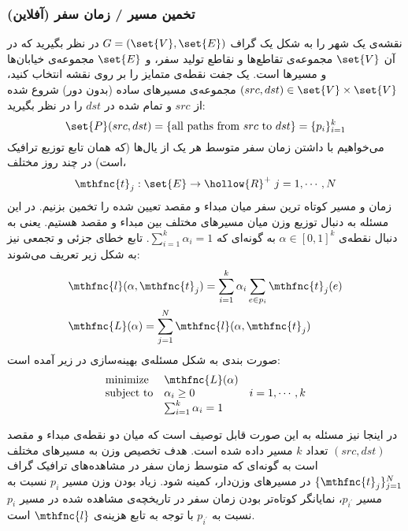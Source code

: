 \subsubsection{
تخمین مسیر / زمان سفر (آفلاین)
}
نقشه‌ی یک شهر را به شکل یک گراف
$G = (\set{V},\set{E})$
در نظر بگیرید که در آن
$\set{V}$
مجموعه‌ی تقاطع‌ها و نقاطع تولید سفر، و
$\set{E}$
مجموعه‌ی خیابان‌ها و مسیرها است. یک جفت نقطه‌ی متمایز را بر روی نقشه انتخاب کنید،
$(src, dst) \in \set{V} \times \set{V}$
مجموعه‌ی مسیرهای ساده
(بدون دور) شروع شده از
$src$
و تمام شده در
$dst$
را در نظر بگیرید:
\[
\set{P}(src,dst) = \{ \mbox{all paths from } src \mbox{ to } dst \} = \{ p_i \}^{k}_{i=1}
\]
می‌خواهیم با داشتن زمان سفر متوسط هر یک از یال‌ها (که همان تابع توزیع ترافیک است) در چند روز مختلف،
\[
\mthfnc{t}_j : \set{E} \rightarrow \hollow{R}^+ \; j = 1,\cdots,N
\]
زمان و مسیر کوتاه ترین سفر میان مبداء و مقصد تعیین شده را تخمین بزنیم. در این مسئله به دنبال توزیع وزن میان مسیرهای مختلف بین مبداء و مقصد هستیم. یعنی به دنبال نقطه‌ی
$\alpha \in [0,1]^k$
به گونه‌ای که
$\sum^{k}_{i=1} \alpha_i = 1$.
تابع خطای جزئی و تجمعی نیز به شکل زیر تعریف می‌شوند:
\[
\begin{split}
&\mthfnc{l}(\alpha, \mthfnc{t}_j) = \sum^{k}_{i=1} \alpha_i \sum_{e \in p_i} \mthfnc{t}_j(e)\\
&\mthfnc{L}(\alpha) = \sum^{N}_{j=1} \mthfnc{l}( \alpha, \mthfnc{t}_j )
\end{split}
\]
صورت بندی به شکل مسئله‌ی بهینه‌سازی در زیر آمده است:
\[
\begin{array}{lll}
\mbox{minimize} & \mthfnc{L}(\alpha) & \\
\mbox{subject to} & \alpha_i \geq 0 & i = 1,\cdots, k\\
& \sum^{k}_{i=1} \alpha_i = 1 &
\end{array}
\]

در اینجا نیز مسئله به این صورت قابل توصیف است که میان دو نقطه‌ی مبداء و مقصد
$(src, dst)$
تعداد
$k$
مسیر داده شده است. هدف تخصیص وزن به مسیرهای مختلف است به گونه‌ای که متوسط زمان سفر در مشاهده‌های ترافیک گراف
$\{ \mthfnc{t}_j \}^{N}_{j=1}$
در مسیرهای وزن‌دار، کمینه شود. زیاد بودن وزن مسیر
$p_i$
نسبت به مسیر
$p_{i^\prime}$،
نمایانگر کوتاه‌تر بودن زمان سفر در تاریخچه‌ی مشاهده شده در مسیر
$p_i$
نسبت به
$p_{i^\prime}$
با توجه به تابع هزینه‌ی
$\mthfnc{l}$
است.





